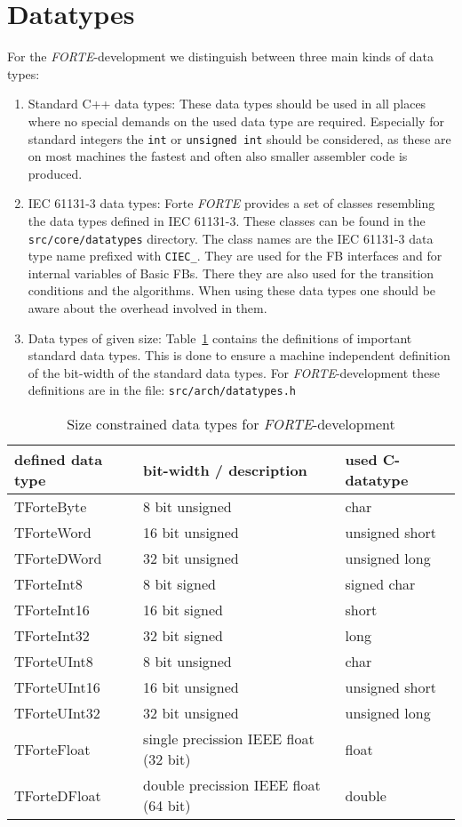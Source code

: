 \documentclass[final,a4paper,10pt, oneside]{article}
\begin{document}
\section{Datatypes}
For the \emph{FORTE}-development we distinguish between three main kinds of data types:
\begin{enumerate}
\item Standard C++ data types: These data types should be used in all places where no special demands on the used data type are required. Especially for standard integers the \verb=int= or \verb=unsigned int= should be considered, as these are on most machines the fastest and often also smaller assembler code is produced. 
\item IEC 61131-3 data types: Forte \emph{FORTE} provides a set of classes resembling the data types defined in IEC 61131-3. These classes can be found in the \verb|src/core/datatypes| directory. The class names are the IEC 61131-3 data type name prefixed with \verb=CIEC_=. They are used for the FB interfaces and for internal variables of Basic FBs. There they are also used for the transition conditions and the algorithms. When using these data types one should be aware about the overhead involved in them.
\item Data types of given size: Table~\ref{tab:datatypes} contains the definitions of important standard data types. This is done to ensure a machine independent definition of the bit-width of the standard data types. For \emph{FORTE}-development these definitions are in the file: \verb|src/arch/datatypes.h|
\end{enumerate}

\begin{table}[ht]
	\centering
	 \caption{Size constrained data types for \emph{FORTE}-development} \label{tab:datatypes}
		\begin{tabular}{lll}
			defined data type	& bit-width / description & used C-datatype \\
			\hline
			TForteByte	&	8 bit unsigned	&   char\\
			TForteWord	&	16 bit unsigned &   unsigned short	\\
			TForteDWord	&	32 bit unsigned	&	unsigned long	 \\
			TForteInt8	&	8 bit signed	&	signed char	 \\
			TForteInt16	&	16 bit signed	&	short	 \\
			TForteInt32	&	32 bit signed	&	long	 \\
			TForteUInt8	&	8 bit unsigned	&	char	 \\
			TForteUInt16	&	16 bit unsigned	&	unsigned short	 \\
			TForteUInt32	&	32 bit unsigned	&	unsigned long	 \\
			TForteFloat	&	single precission IEEE float (32 bit)&	float	 \\
			TForteDFloat	&	double precission IEEE float (64 bit) &	double	
		\end{tabular}
\end{table}
	
\end{document}
